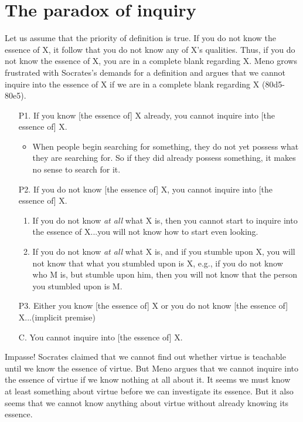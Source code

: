 \documentclass[10 pt]{article}
\begin{document}
\section*{The paradox of inquiry}
Let us assume that the priority of definition is true. If you do not know the essence of  X, it follow that you do not know any of X's qualities. Thus, if you do not know the essence of X, you are in a complete blank regarding X. Meno grows frustrated with Socrates's demands for a definition and argues that we cannot inquire into the essence of X if we are in a complete blank regarding X (80d5-80e5). 

\begin{enumerate}
\item[P1.] If you know [the essence of] X already, you cannot inquire into [the essence of] X. 
\begin{itemize}
\item When people begin searching for something, they do not yet possess what they are searching for. So if they did already possess something, it makes no sense to search for it.
\end{itemize}
\item[P2.] If you do not know [the essence of] X, you cannot inquire into [the essence of] X.\begin{enumerate}
\item If you do not know \emph{at all} what X is, then you cannot start to inquire into the essence of X...you will not know how to start even looking.
\item If you do not know \emph{at all} what X is, and if you stumble upon X, you will not know that what you stumbled upon is X, e.g., if you do not know who M is, but stumble upon him, then you will not know that the person you stumbled upon is M. 
\end{enumerate}
\item[P3.] Either you know [the essence of]  X or you do not know [the essence of] X...(implicit premise) 
\item[C.] You cannot inquire into [the essence of] X.
\end{enumerate}
Impasse!  Socrates claimed that we cannot find out whether virtue is teachable until we know the essence of virtue.  But Meno argues that we cannot inquire into the essence of virtue if we know nothing at all about it. It seems we must know at least something about virtue before we can investigate its essence. But it also seems that we cannot know anything about virtue without already knowing its essence.  
\end{document}
